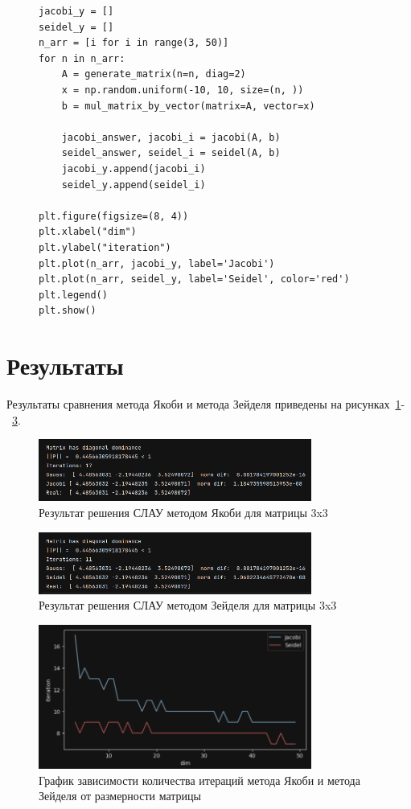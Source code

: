 \documentclass[a4paper, 14pt]{extarticle}
\begin{document}
\begin{figure}[H]
\begin{lstlisting}[language={},caption={Построение графика},label={lst:code3}]
jacobi_y = []
seidel_y = []
n_arr = [i for i in range(3, 50)]
for n in n_arr:
    A = generate_matrix(n=n, diag=2)
    x = np.random.uniform(-10, 10, size=(n, ))
    b = mul_matrix_by_vector(matrix=A, vector=x)

    jacobi_answer, jacobi_i = jacobi(A, b)
    seidel_answer, seidel_i = seidel(A, b)
    jacobi_y.append(jacobi_i)
    seidel_y.append(seidel_i)

plt.figure(figsize=(8, 4))
plt.xlabel("dim")
plt.ylabel("iteration")
plt.plot(n_arr, jacobi_y, label='Jacobi')
plt.plot(n_arr, seidel_y, label='Seidel', color='red')
plt.legend()
plt.show()
\end{lstlisting}
\end{figure}


\section{Результаты}

Результаты сравнения метода Якоби и метода Зейделя приведены на рисунках~\ref{fig:img1}-~\ref{fig:img3}.


\begin{figure}[H]
\centering
\includegraphics[width=0.8\textwidth]{images/res1.png}
\caption{Результат решения СЛАУ методом Якоби для матрицы 3x3}
\label{fig:img1}
\end{figure}


\begin{figure}[H]
\centering
\includegraphics[width=0.8\textwidth]{images/res2.png}
\caption{Результат решения СЛАУ методом Зейделя для матрицы 3x3}
\label{fig:img2}
\end{figure}


\begin{figure}[H]
\centering
\includegraphics[width=0.8\textwidth]{images/res3.png}
\caption{График зависимости количества итераций метода Якоби и метода Зейделя от размерности матрицы}
\label{fig:img3}
\end{figure}
\end{document}
